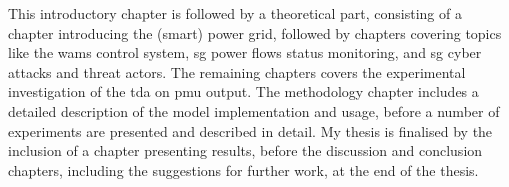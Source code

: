 This introductory chapter is followed by a theoretical part, consisting of a chapter introducing the (smart) power grid, followed by chapters covering topics like the \acrshort{wams} control system, \acrfull{sg} power flows status monitoring, and \acrlong{sg} cyber attacks and threat actors. 
The remaining chapters covers the experimental investigation of the \acrlong{tda} on \acrlong{pmu} output. The methodology chapter includes a detailed description of the model implementation and usage, before a number of experiments are presented and described in detail.
My thesis is finalised by the inclusion of a chapter presenting results, before the discussion and conclusion chapters, including the suggestions for further work, at the end of the thesis. 


